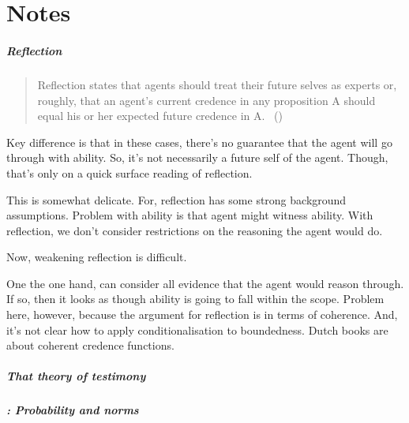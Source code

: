 \chapter{Notes}
\label{cha:notes}

\paragraph{Reflection}

\begin{note}[Reflection]
  \begin{quote}
    Reflection states that agents should treat their future selves as experts or, roughly, that an agent’s current credence in any proposition A should equal his or her expected future credence in A.%
    \mbox{ }\hfill\mbox{(\citeyear[59]{Briggs:2009up})}
  \end{quote}
\end{note}

\begin{note}
  Key difference is that in these cases, there's no guarantee that the agent will go through with ability.
  So, it's not necessarily a future self of the agent.
  Though, that's only on a quick surface reading of reflection.

  This is somewhat delicate.
  For, reflection has some strong background assumptions.
  Problem with ability is that agent might witness ability.
  With reflection, we don't consider restrictions on the reasoning the agent would do.

  Now, weakening reflection is difficult.

  One the one hand, can consider all evidence that the agent would reason through.
  If so, then it looks as though ability is going to fall within the scope.
  Problem here, however, because the argument for reflection is in terms of coherence.
  And, it's not clear how to apply conditionalisation to boundedness.
  Dutch books are about coherent credence functions.
\end{note}

\paragraph{That theory of testimony}



\paragraph{\zS{}: Probability and norms}

